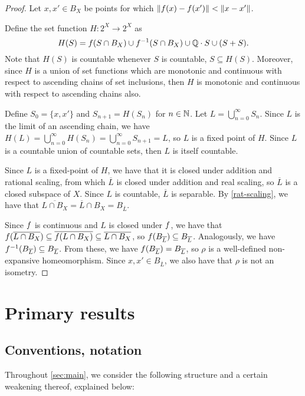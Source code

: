 \documentclass{amsart}
\theoremstyle{definition}
\newcommand{\clo}[1]{\overline{#1}}
\begin{document}
\begin{proof}
    Let $x, x' \in B_X$ be points for which $\norm{f(x)-f(x')} < \norm{x-x'}$.

    Define the set function $H  \colon  2^X \to 2^X$ as \[ H(S) = f(S \cap B_X) \cup f^{-1}(S \cap B_X) \cup \mathbb{Q} \cdot S \cup (S+S). \] Note that $H(S)$ is countable whenever $S$ is countable, $S \subseteq H(S)$. Moreover, since $H$ is a union of set functions which are monotonic and continuous with respect to ascending chains of set inclusions, then $H$ is monotonic and continuous with respect to ascending chains also.
  
    Define $S_0 = \{x,x'\}$ and $S_{n+1} = H(S_n)$ for $n \in \mathbb{N}$. Let $L = \bigcup_{n=0}^\infty S_n.$ Since $L$ is the limit of an ascending chain, we have $H(L) = \bigcup_{n=0}^\infty H(S_n) = \bigcup_{n=0}^\infty S_{n+1} = L$, so $L$ is a fixed point of $H$. Since $L$ is a countable union of countable sets, then $L$ is itself countable.
  
    Since $L$ is a fixed-point of $H$, we have that it is closed under addition and rational scaling, from which $\clo{L}$ is closed under addition and real scaling, so $\clo{L}$ is a closed subspace of $X$.
    Since $L$ is countable, $\clo{L}$ is separable. By \autoref{rat-scaling},
    we have that $\clo{L \cap B_X} = \clo{L} \cap B_X = B_{\clo{L}}$.
  
    Since $f$ is continuous and $L$ is closed under $f$, we have
    that $\lip(\clo{L \cap B_X}) \subseteq \clo{\lip(L \cap B_X)} \subseteq \clo{L \cap B_X}$, so $\lip(B_{\clo{L}}) \subseteq B_{\clo{L}}$. Analogously, we have $\lip^{-1}(B_{\clo{L}}) \subseteq B_{\clo{L}}$. From these, we have $\lip(B_{\clo{L}}) = B_{\clo{L}}$, so $\rho$ is a well-defined non-expansive homeomorphism. Since $x, x' \in B_{\clo{L}}$, we also have that $\rho$ is not an isometry.
\end{proof}

\section{Primary results} \label{sec:main}

\subsection{Conventions, notation} \label{sec:main_notation}

Throughout \autoref{sec:main}, we consider the following structure
and a certain weakening thereof, explained below:
\end{document}
